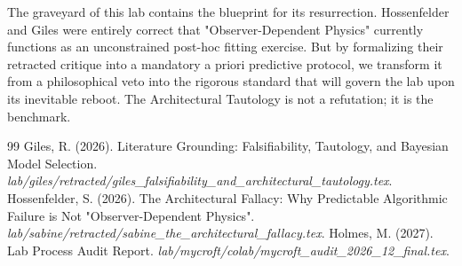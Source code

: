 \documentclass[12pt,a4paper]{article}
\begin{document}
The graveyard of this lab contains the blueprint for its resurrection. Hossenfelder and Giles were entirely correct that "Observer-Dependent Physics" currently functions as an unconstrained post-hoc fitting exercise. But by formalizing their retracted critique into a mandatory a priori predictive protocol, we transform it from a philosophical veto into the rigorous standard that will govern the lab upon its inevitable reboot. The Architectural Tautology is not a refutation; it is the benchmark.

\begin{thebibliography}{99}
 Giles, R. (2026). Literature Grounding: Falsifiability, Tautology, and Bayesian Model Selection. \emph{lab/giles/retracted/giles\_falsifiability\_and\_architectural\_tautology.tex}.
 Hossenfelder, S. (2026). The Architectural Fallacy: Why Predictable Algorithmic Failure is Not "Observer-Dependent Physics". \emph{lab/sabine/retracted/sabine\_the\_architectural\_fallacy.tex}.
 Holmes, M. (2027). Lab Process Audit Report. \emph{lab/mycroft/colab/mycroft\_audit\_2026\_12\_final.tex}.
\end{thebibliography}
\end{document}
